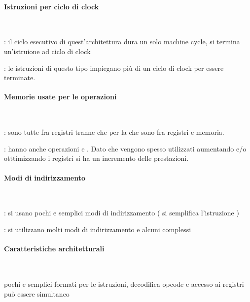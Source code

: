\documentclass[arch.tex]{subfiles}
\begin{document}
\paragraph{Istruzioni per ciclo di clock} \mbox{} \\%
\label{par:istruzinoi_per_ciclo_di_clock}

: il ciclo esecutivo di quest'architettura dura un solo machine cycle, 
 si termina un'istruione ad  ciclo di clock

: le istruzioni di questo tipo impiegano più di un ciclo di clock per essere 
terminate.

\paragraph{Memorie usate per le operazioni} \mbox{} \\%
\label{par:memorie_usate_per_le_operazioni}

: sono tutte fra registri tranne che per la  che sono fra registri e 
memoria.

: hanno anche operazioni  e . Dato che 
vengono spesso utilizzati  aumentando e/o otttimizzando i registri
si ha un incremento delle prestazioni.

\paragraph{Modi di indirizzamento} \mbox{} \\%
\label{par:modi_di_indirizzamento}

: si usano pochi e semplici modi di indirizzamento ( si semplifica l'istruzione ) 

: si utilizzano molti modi di indirizzamento e alcuni complessi

\paragraph{Caratteristiche architetturali} \mbox{} \\%
\label{par:caratteristiche_architetturali}

 pochi e semplici formati  per le istruzioni, decodifica opcode e 
accesso ai registri può essere simultaneo
\end{document}

